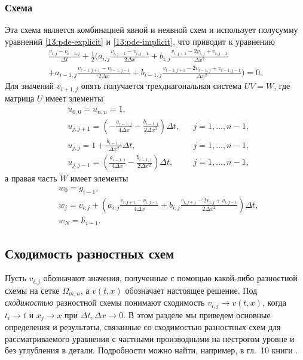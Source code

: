 \subsubsection*{Схема \cn}
Эта схема является комбинацией явной и неявной схем и использует полусумму уравнений \eqref{13:pde-explicit} и \eqref{13:pde-implicit}, что приводит к уравнению
\begin{multline}
\label{13:pde-cn}
\frac{v_{i,j} - v_{i-1,j}}{\Delta t} + \frac12 \Biggl(
  a_{i,j} \frac{v_{i,j+1} - v_{i,j-1}}{2\Delta x} + b_{i,j} \frac{v_{i,j+1} - 2v_{i,j} + v_{i,j-1}}{\Delta x^2} \\
  + a_{i-1,j} \frac{v_{i-1,j+1} - v_{i-1,j-1}}{2\Delta x} + b_{i-1,j} \frac{v_{i-1,j+1} - 2v_{i-1,j} + v_{i-1,j-1}}{\Delta x^2} \Biggr) = 0.
\end{multline}
Для значений $v_{i+1,j}$ опять получается трехдиагональная система  $UV = W$, где матрица $U$ имеет элементы
\begin{align*}
&u_{0,0} = u_{n,n} = 1,\\
&u_{j,j+1} = \left(-\frac{a_{i-1,j}}{4\Delta x} - \frac{b_{i-1,j}}{2\Delta x^2}\right)\Delta t, & &j=1,\dots,n-1,\\
&u_{j,j} = 1 + \frac{b_{i-1,j}}{\Delta x^2}\Delta t, & &j=1,\dots,n-1,\\
&u_{j,j-1} = \left( \frac{a_{i-1,j}}{4\Delta x} - \frac{b_{i-1,j}}{2\Delta x^2}\right)\Delta t,& &j=1,\dots,n-1,
\end{align*}
а правая часть $W$ имеет элементы
\begin{align*}
&w_0 = g_{i-1},\\
&w_j =  v_{i,j} + \left( a_{i,j} \frac{v_{i,j+1} - v_{i,j-1}}{4\Delta x} + b_{i,j} \frac{v_{i,j+1} - 2v_{i,j} + v_{i,j-1}}{2\Delta x^2} \right) \Delta t,\\
&w_{N} = h_{i-1}.
\end{align*}


\subsection{Сходимость разностных схем}

Пусть $v_{i,j}$ обозначают значения, полученные с помощью какой-либо разностной схемы  на сетке $\Omega_{m,n}$, а $v(t,x)$ обозначает настоящее решение.
Под \emph{сходимостью} разностной схемы понимают сходимость $v_{i,j} \to v(t,x)$, когда $t_i\to t$ и $x_j\to x$ при $\Delta t,\Delta x \to 0$.
В этом разделе мы приведем основные определения и результаты, связанные со сходимостью разностных схем для рассматриваемого уравнения с частными производными на нестрогом уровне и без углубления в детали.
Подробности можно найти, например, в гл.~10 книги \cite{BakhvalovZhidkovKobelkov}.

